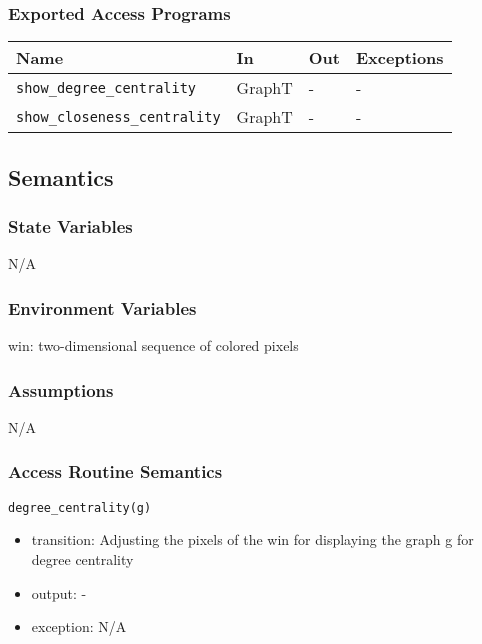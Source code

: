 \documentclass[12pt, titlepage]{article}
\begin{document}
\subsubsection{Exported Access Programs}
\begin{center}
\begin{tabular}{|p{6cm}|p{2.5cm}|p{2.5cm}|p{4cm}|}
\hline
\textbf{Name} & \textbf{In} & \textbf{Out} & \textbf{Exceptions} \\
\hline
\texttt{show\_degree\_centrality} & GraphT& - & - \\
\texttt{show\_closeness\_centrality} & GraphT & - & - \\
\hline
\end{tabular}
\end{center}

\subsection{Semantics}

\subsubsection{State Variables}

N/A

\subsubsection{Environment Variables}

win: two-dimensional sequence of colored pixels

\subsubsection{Assumptions}

N/A

\subsubsection{Access Routine Semantics}

\noindent \texttt{degree\_centrality(g)}
\begin{itemize}
\item transition: Adjusting the pixels of the win for displaying the graph g for degree centrality
\item output: -
\item exception: N/A  
\end{itemize}
\end{document}
